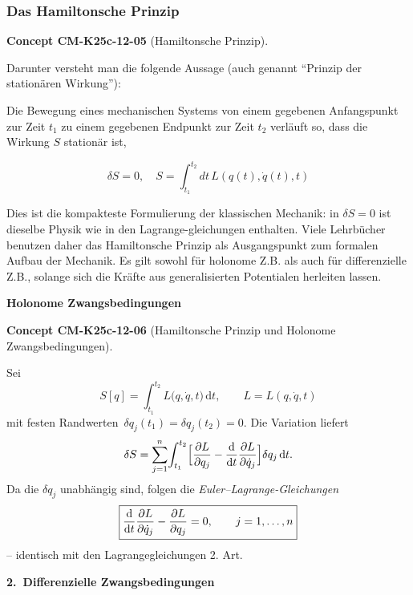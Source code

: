 \documentclass[10pt, letterpaper]{article}
\newcommand{\CustomHeading}[3]{%
  \par\medskip\noindent%
  \textbf{#1 #2} \textnormal{(#3)}.\enskip%
}
\newenvironment{CONC}[2]{\begin{unitbox}\CustomHeading{Concept}{#1}{#2}}{\end{unitbox}}
\begin{document}
\subsubsection{Das Hamiltonsche Prinzip} 



\begin{CONC}{CM-K25c-12-05}{Hamiltonsche Prinzip}
Darunter versteht man die folgende Aussage (auch genannt ``Prinzip der stationären Wirkung''):

Die Bewegung eines mechanischen Systems von einem gegebenen Anfangspunkt zur Zeit $t_1$ zu einem gegebenen Endpunkt zur Zeit $t_2$ verläuft so, dass die Wirkung $S$ stationär ist,

\[\delta S = 0, \quad S = \int_{t_1}^{t_2} dt\, L(q(t), \dot{q}(t), t)\]

Dies ist die kompakteste Formulierung der klassischen Mechanik: in $\delta S = 0$ ist dieselbe Physik wie in den Lagrange-gleichungen enthalten. Viele Lehrbücher benutzen daher das Hamiltonsche Prinzip als Ausgangspunkt zum formalen Aufbau der Mechanik. Es gilt sowohl für holonome Z.B. als auch für differenzielle Z.B., solange sich die Kräfte aus generalisierten Potentialen herleiten lassen.
\end{CONC}



\textbf{Holonome Zwangsbedingungen}\\[2pt]
\begin{CONC}{CM-K25c-12-06}{Hamiltonsche Prinzip und Holonome Zwangsbedingungen}
Sei
\[
  S[q]=\int_{t_1}^{t_2} L\bigl(q,\dot q,t\bigr)\,\mathrm dt,
  \qquad
  L=L(q,\dot q,t)
\]
mit festen Randwerten
$\,\delta q_j(t_1)=\delta q_j(t_2)=0$.  
Die Variation liefert
\[
  \delta S
  =\sum_{j=1}^{n}\!
     \int_{t_1}^{t_2}
       \Bigl[
         \frac{\partial L}{\partial q_j}
        -\frac{\mathrm d}{\mathrm dt}
          \frac{\partial L}{\partial\dot q_j}
       \Bigr]
       \delta q_j\,\mathrm dt .
\]
Da die $\delta q_j$ unabhängig sind, folgen die
\emph{Euler–Lagrange-Gleichungen}
\[
  \boxed{%
    \frac{\mathrm d}{\mathrm dt}
      \frac{\partial L}{\partial\dot q_j}
    -\frac{\partial L}{\partial q_j}=0,
    \qquad j=1,\dots,n } 
\]
– identisch mit den Lagrangegleichungen 2. Art.
\end{CONC}

\textbf{2.\ Differenzielle Zwangsbedingungen}\\[2pt]
\end{document}

